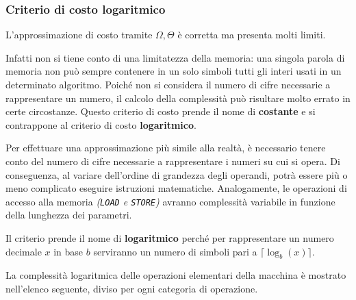 \documentclass[italian, 10pt]{article}
\begin{document}
\subsubsection{Criterio di costo logaritmico}
\label{sec:criterio-costo-logaritmico}

L'approssimazione di costo tramite \(\Omega, \Theta\) è corretta ma presenta molti limiti.

Infatti non si tiene conto di una limitatezza della memoria: una singola parola di memoria non può sempre contenere in un solo simboli tutti gli interi usati in un determinato algoritmo.
Poiché non si considera il numero di cifre necessarie a rappresentare un numero, il calcolo della complessità può risultare molto errato in certe circostanze.
Questo criterio di costo prende il nome di \textbf{costante} e si contrappone al criterio di costo \textbf{logaritmico}.

\bigskip
Per effettuare una approssimazione più simile alla realtà, è necessario tenere conto del numero di cifre necessarie a rappresentare i numeri su cui si opera.
Di conseguenza, al variare dell'ordine di grandezza degli operandi, potrà essere più o meno complicato eseguire istruzioni matematiche.
Analogamente, le operazioni di accesso alla memoria \textit{(\texttt{LOAD} e \texttt{STORE})} avranno complessità variabile in funzione della lunghezza dei parametri.

Il criterio prende il nome di \textbf{logaritmico} perché per rappresentare un numero decimale \(x\) in base \(b\) serviranno un numero di simboli pari a \(\lceil \log_b(x) \rceil\).

La complessità logaritmica delle operazioni elementari della macchina \RAM è mostrato nell'elenco seguente, diviso per ogni categoria di operazione.
\end{document}
